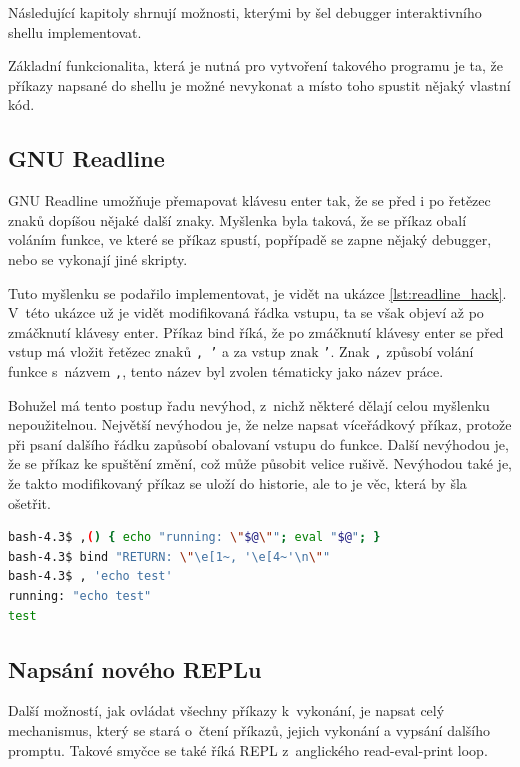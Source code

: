 \documentclass[thesis=M,czech]{FITthesis}[2012/06/26]
\begin{document}
Následující kapitoly shrnují možnosti, kterými by šel debugger interaktivního shellu implementovat.

Základní funkcionalita, která je nutná pro vytvoření takového programu je ta, že příkazy napsané do shellu je možné nevykonat a místo toho spustit nějaký vlastní kód.

\subsection{GNU Readline}

GNU Readline umožňuje přemapovat klávesu enter tak, že se před i po řetězec znaků dopíšou nějaké další znaky. Myšlenka byla taková, že se příkaz obalí voláním funkce, ve které se příkaz spustí, popřípadě se zapne nějaký debugger, nebo se vykonají jiné skripty.

Tuto myšlenku se podařilo implementovat, je vidět na ukázce \ref{lst:readline_hack}. V~této ukázce už je vidět modifikovaná řádka vstupu, ta se však objeví až po zmáčknutí klávesy enter. Příkaz bind říká, že po zmáčknutí klávesy enter se před vstup má vložit řetězec znaků \texttt{, '} a za vstup znak \texttt{'}. Znak \texttt{,} způsobí volání funkce s~názvem \texttt{,}, tento název byl zvolen tématicky jako název práce.

Bohužel má tento postup řadu nevýhod, z~nichž některé dělají celou myšlenku nepoužitelnou. Největší nevýhodou je, že nelze napsat víceřádkový příkaz, protože při psaní dalšího řádku zapůsobí obalovaní vstupu do funkce. Další nevýhodou je, že se příkaz ke spuštění změní, což může působit velice rušivě. Nevýhodou také je, že takto modifikovaný příkaz se uloží do historie, ale to je věc, která by šla ošetřit.

\begin{lstlisting}[language=bash, caption={Modifikace Readline}, label={lst:readline_hack}]
bash-4.3$ ,() { echo "running: \"$@\""; eval "$@"; }
bash-4.3$ bind "RETURN: \"\e[1~, '\e[4~'\n\""
bash-4.3$ , 'echo test'
running: "echo test"
test
\end{lstlisting}

%
%
\subsection{Napsání nového REPLu}

Další možností, jak ovládat všechny příkazy k~vykonání, je napsat celý mechanismus, který se stará o~čtení příkazů, jejich vykonání a vypsání dalšího promptu. Takové smyčce se také říká REPL z~anglického read-eval-print loop.
\end{document}
